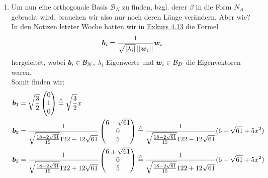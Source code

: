 \begin{Beispiel}
\begin{enumerate}
    \item Um nun eine orthogonale Basis $\mathcal{B}_N$ zu finden, bzgl. derer $\beta$ in die Form $N_A$ gebracht wird, brauchen wir also nur noch deren Länge verändern. Aber wie?\\
    In den Notizen letzter Woche hatten wir in \hyperref[satz:04Hauptachsenbasis]{Exkurs 4.13} die Formel
    \begin{equation*}
        {{\text{\boldmath${b}$}}}_i=\frac{1}{\sqrt{\left|{\lambda_i}\right|}\left|\left|{{\text{\boldmath${w}$}}}_i\right|\right|}{{\text{\boldmath${w}$}}}_i
    \end{equation*}
    hergeleitet, wobei ${{\text{\boldmath${b}$}}}_i\in \mathcal{B}_N$, $\lambda_i$ Eigenwerte und ${{\text{\boldmath${w}$}}}_i\in\mathcal{B}_D$ die Eigenvektoren waren.\\
    Somit finden wir:
    \begin{align*}
        {{\text{\boldmath${b}$}}}_1&=\sqrt{\frac{3}{2}}\begin{pmatrix}0\\1\\0\end{pmatrix}\overset{\wedge}{=}\sqrt{\frac{3}{2}}x\\
        {{\text{\boldmath${b}$}}}_2&=\frac{1}{\sqrt{\frac{18-2\sqrt{61}}{15}}122-12\sqrt{61}}\begin{pmatrix}6-\sqrt{61}\\0\\5\end{pmatrix}\overset{\wedge}{=}\frac{1}{\sqrt{\frac{18-2\sqrt{61}}{15}}122-12\sqrt{61}}(6-\sqrt{61}+5x^2)\\
        {{\text{\boldmath${b}$}}}_3&=\frac{1}{\sqrt{\frac{18-2\sqrt{61}}{15}}122+12\sqrt{61}}\begin{pmatrix}6+\sqrt{61}\\0\\5\end{pmatrix}\overset{\wedge}{=}\frac{1}{\sqrt{\frac{18-2\sqrt{61}}{15}}122+12\sqrt{61}}(6+\sqrt{61}+5x^2)
    \end{align*}
\end{enumerate}
\end{Beispiel}

